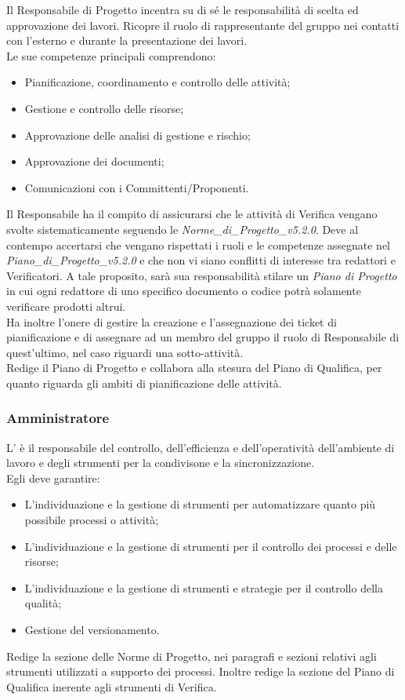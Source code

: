 Il Responsabile di Progetto incentra su di sé le responsabilità di scelta ed approvazione dei lavori. Ricopre il ruolo di rappresentante del gruppo nei contatti con l'esterno e durante la presentazione dei lavori.\\
Le sue competenze principali comprendono:
\begin{itemize}
\item Pianificazione, coordinamento e controllo delle attivit\`{a};
\item Gestione e controllo delle risorse;
\item Approvazione delle analisi di gestione e rischio;
\item Approvazione dei documenti;
\item Comunicazioni con i Committenti/Proponenti.
\end{itemize}
Il Responsabile ha il compito di assicurarsi che le attivit\`{a} di Verifica vengano svolte sistematicamente seguendo le \emph{Norme\_di\_Progetto\_v5.2.0}. Deve al contempo accertarsi che vengano rispettati i ruoli e le competenze assegnate nel \emph{Piano\_di\_Progetto\_v5.2.0} e che non vi siano conflitti di interesse tra redattori e Verificatori. A tale proposito, sarà sua responsabilità stilare un \emph{Piano di Progetto} in cui ogni redattore di uno specifico documento o codice potrà solamente verificare prodotti altrui.\\
Ha inoltre l'onere di gestire la creazione e l'assegnazione dei ticket di pianificazione e di assegnare ad un membro del gruppo il ruolo di Responsabile di quest'ultimo, nel caso riguardi una sotto-attivit\`{a}.\\
Redige il Piano di Progetto e collabora alla stesura del Piano di Qualifica, per quanto riguarda gli ambiti di pianificazione delle attivit\`{a}.

\subsubsection{Amministratore}

L' è il responsabile del controllo, dell'efficienza e dell'operatività dell'ambiente di lavoro e degli strumenti per la condivisone e la sincronizzazione.\\
Egli deve garantire:
\begin{itemize}
\item L'individuazione e la gestione di strumenti per automatizzare quanto più possibile processi o attivit\`{a};
\item L'individuazione e la gestione di strumenti per il controllo dei processi e delle risorse;
\item L'individuazione e la gestione di strumenti e strategie per il controllo della qualità;
\item Gestione del versionamento.
\end{itemize}
Redige la sezione delle Norme di Progetto, nei paragrafi e sezioni relativi agli strumenti utilizzati a supporto dei processi. Inoltre redige la sezione del Piano di Qualifica inerente agli strumenti di Verifica.

